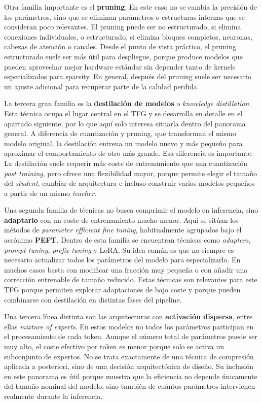 Otra familia importante es el \textbf{pruning}. En este caso no se cambia la precisión de los parámetros, sino que se eliminan parámetros o estructuras internas que se consideran poco relevantes. El pruning puede ser no estructurado, si elimina conexiones individuales, o estructurado, si elimina bloques completos, neuronas, cabezas de atención o canales. Desde el punto de vista práctico, el pruning estructurado suele ser más útil para despliegue, porque produce modelos que pueden aprovechar mejor hardware estándar sin depender tanto de kernels especializados para sparsity. En general, después del pruning suele ser necesario un ajuste adicional para recuperar parte de la calidad perdida.

La tercera gran familia es la \textbf{destilación de modelos} o \textit{knowledge distillation}. Esta técnica ocupa el lugar central en el TFG y se desarrolla en detalle en el apartado siguiente, por lo que aquí solo interesa situarla dentro del panorama general. A diferencia de cuantización y pruning, que transforman el mismo modelo original, la destilación entrena un modelo nuevo y más pequeño para aproximar el comportamiento de otro más grande. Esa diferencia es importante. La destilación suele requerir más coste de entrenamiento que una cuantización \textit{post training}, pero ofrece una flexibilidad mayor, porque permite elegir el tamaño del \textit{student}, cambiar de arquitectura e incluso construir varios modelos pequeños a partir de un mismo \textit{teacher}.

Una segunda familia de técnicas no busca comprimir el modelo en inferencia, sino \textbf{adaptarlo} con un coste de entrenamiento mucho menor. Aquí se sitúan los métodos de \textit{parameter efficient fine tuning}, habitualmente agrupados bajo el acrónimo \textbf{PEFT}. Dentro de esta familia se encuentran técnicas como \textit{adapters}, \textit{prompt tuning}, \textit{prefix tuning} y LoRA. Su idea común es que no siempre es necesario actualizar todos los parámetros del modelo para especializarlo. En muchos casos basta con modificar una fracción muy pequeña o con añadir una corrección entrenable de tamaño reducido. Estas técnicas son relevantes para este TFG porque permiten explorar adaptaciones de bajo coste y porque pueden combinarse con destilación en distintas fases del pipeline.

Una tercera línea distinta son las arquitecturas con \textbf{activación dispersa}, entre ellas \textit{mixture of experts}. En estos modelos no todos los parámetros participan en el procesamiento de cada token. Aunque el número total de parámetros puede ser muy alto, el coste efectivo por token es menor porque solo se activa un subconjunto de expertos. No se trata exactamente de una técnica de compresión aplicada a posteriori, sino de una decisión arquitectónica de diseño. Su inclusión en este panorama es útil porque muestra que la eficiencia no depende únicamente del tamaño nominal del modelo, sino también de cuántos parámetros intervienen realmente durante la inferencia.

